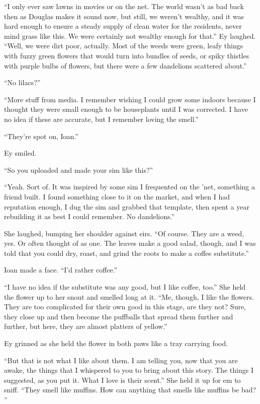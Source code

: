 ``I only ever saw lawns in movies or on the net. The world wasn't as bad back then as Douglas makes it sound now, but still, we weren't wealthy, and it was hard enough to ensure a steady supply of clean water for the residents, never mind grass like this. We were certainly not wealthy enough for that.'' Ey laughed. ``Well, we were dirt poor, actually. Most of the weeds were green, leafy things with fuzzy green flowers that would turn into bundles of seeds, or spiky thistles with purple bulbs of flowers, but there were a few dandelions scattered about.''

``No lilacs?''

``More stuff from media. I remember wishing I could grow some indoors because I thought they were small enough to be houseplants until I was corrected. I have no idea if these are accurate, but I remember loving the smell.''

``They're spot on, Ioan.''

Ey smiled.

``So you uploaded and made your sim like this?''

``Yeah. Sort of. It was inspired by some sim I frequented on the 'net, something a friend built. I found something close to it on the market, and when I had reputation enough, I dug the sim and grabbed that template, then spent a year rebuilding it as best I could remember. No dandelions.''

She laughed, bumping her shoulder against eirs. ``Of course. They are a weed, yes. Or often thought of as one. The leaves make a good salad, though, and I was told that you could dry, roast, and grind the roots to make a coffee substitute.''

Ioan made a face. ``I'd rather coffee.''

``I have no idea if the substitute was any good, but I like coffee, too.'' She held the flower up to her snout and smelled long at it. ``Me, though, I like the flowers. They are too complicated for their own good in this stage, are they not? Sure, they close up and then become the puffballs that spread them further and further, but here, they are almost platters of yellow.''

Ey grinned as she held the flower in both paws like a tray carrying food.

``But that is not what I like about them. I am telling you, now that you are awake, the things that I whispered to you to bring about this story. The things I suggested, as you put it. What I love is their scent.'' She held it up for em to sniff. ``They smell like muffins. How can anything that smells like muffins be bad? ''

